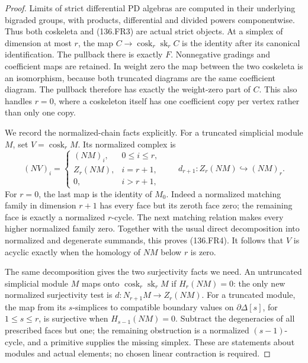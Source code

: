 \begin{proof}
Limits of strict differential PD algebras are computed in their
underlying bigraded groups, with products, differential and divided
powers componentwise. Thus both coskeleta and (136.FR3) are actual
strict objects. At a simplex of dimension at most \(r\), the
map \(C\to\operatorname{cosk}_r\operatorname{sk}_r C\)
is the identity after its canonical identification. The pullback
there is exactly \(F\). Nonnegative gradings and coefficient maps are retained. In weight
zero the map between the two coskeleta is an isomorphism, because
both truncated diagrams are the same coefficient diagram. The
pullback therefore has exactly the weight-zero part of \(C\).
This also handles \(r=0\), where a coskeleton itself has one
coefficient copy per vertex rather than only one copy.

We record the normalized-chain facts explicitly. For a truncated
simplicial module \(M\), set \(V=\operatorname{cosk}_r M\).
Its normalized complex is
\[
 (NV)_i=
 \begin{cases}
 (NM)_i,&0\leq i\leq r,\\
 Z_r(NM),&i=r+1,\\
 0,&i>r+1,
 \end{cases}
 \qquad d_{r+1}:Z_r(NM)\hookrightarrow(NM)_r.
                                                        \tag{136.FR4}
\]
For \(r=0\), the last map is the identity of \(M_0\).
Indeed a normalized matching family in dimension \(r+1\)
has every face but its zeroth face zero; the remaining face is
exactly a normalized \(r\)-cycle. The next matching relation
makes every higher normalized family zero. Together with the
usual direct decomposition into normalized and degenerate
summands, this proves (136.FR4). It follows that \(V\) is
acyclic exactly when the homology of \(NM\) below \(r\)
is zero.

The same decomposition gives the two surjectivity facts we need.
An untruncated simplicial module \(M\) maps onto
\(\operatorname{cosk}_r\operatorname{sk}_r M\) if
\(H_r(NM)=0\): the only new normalized surjectivity test is
\(d:N_{r+1}M\to Z_r(NM)\). For a truncated module, the
map from its \(s\)-simplices to compatible boundary values
on \(\partial\Delta[s]\), for \(1\leq s\leq r\),
is surjective when \(H_{s-1}(NM)=0\). Subtract the degeneracies
of all prescribed faces but one; the remaining obstruction is a
normalized \((s-1)\)-cycle, and a primitive supplies the missing
simplex. These are statements about modules and actual elements;
no chosen linear contraction is required.


\end{proof}
